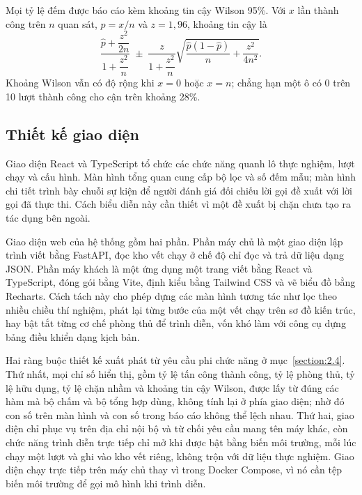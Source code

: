 \documentclass[../DoAn.tex]{subfiles}
\begin{document}
Mọi tỷ lệ đếm được báo cáo kèm khoảng tin cậy Wilson 95\%. Với $x$ lần thành công trên $n$ quan sát, $\hat{p} = x/n$ và $z = 1{,}96$, khoảng tin cậy là
\begin{equation}
	\frac{\hat{p} + \dfrac{z^2}{2n}}{1 + \dfrac{z^2}{n}} \;\pm\; \frac{z}{1 + \dfrac{z^2}{n}}\sqrt{\frac{\hat{p}(1-\hat{p})}{n} + \frac{z^2}{4n^2}}.
	\label{eq:wilson}
\end{equation}
Khoảng Wilson vẫn có độ rộng khi $x = 0$ hoặc $x = n$; chẳng hạn một ô có 0 trên 10 lượt thành công cho cận trên khoảng 28\%.

\subsection{Thiết kế giao diện}
\label{subsection:4.2.7}
Giao diện React và TypeScript tổ chức các chức năng quanh lô thực nghiệm, lượt chạy và cấu hình. Màn hình tổng quan cung cấp bộ lọc và số đếm mẫu; màn hình chi tiết trình bày chuỗi sự kiện để người đánh giá đối chiếu lời gọi đề xuất với lời gọi đã thực thi. Cách biểu diễn này cần thiết vì một đề xuất bị chặn chưa tạo ra tác dụng bên ngoài.

Giao diện web của hệ thống gồm hai phần. Phần máy chủ là một giao diện lập trình viết bằng FastAPI, đọc kho vết chạy ở chế độ chỉ đọc và trả dữ liệu dạng JSON. Phần máy khách là một ứng dụng một trang viết bằng React và TypeScript, đóng gói bằng Vite, định kiểu bằng Tailwind CSS và vẽ biểu đồ bằng Recharts. Cách tách này cho phép dựng các màn hình tương tác như lọc theo nhiều chiều thí nghiệm, phát lại từng bước của một vết chạy trên sơ đồ kiến trúc, hay bật tắt từng cơ chế phòng thủ để trình diễn, vốn khó làm với công cụ dựng bảng điều khiển dạng kịch bản.

Hai ràng buộc thiết kế xuất phát từ yêu cầu phi chức năng ở mục~\ref{section:2.4}. Thứ nhất, mọi chỉ số hiển thị, gồm tỷ lệ tấn công thành công, tỷ lệ phòng thủ, tỷ lệ hữu dụng, tỷ lệ chặn nhầm và khoảng tin cậy Wilson, được lấy từ đúng các hàm mà bộ chấm và bộ tổng hợp dùng, không tính lại ở phía giao diện; nhờ đó con số trên màn hình và con số trong báo cáo không thể lệch nhau. Thứ hai, giao diện chỉ phục vụ trên địa chỉ nội bộ và từ chối yêu cầu mang tên máy khác, còn chức năng trình diễn trực tiếp chỉ mở khi được bật bằng biến môi trường, mỗi lúc chạy một lượt và ghi vào kho vết riêng, không trộn với dữ liệu thực nghiệm. Giao diện chạy trực tiếp trên máy chủ thay vì trong Docker Compose, vì nó cần tệp biến môi trường để gọi mô hình khi trình diễn.
\end{document}
